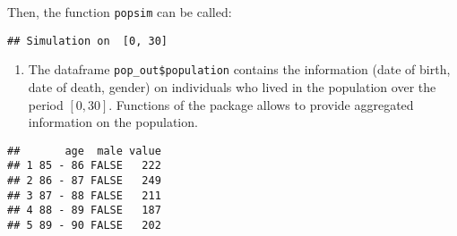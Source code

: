 Then, the function \texttt{popsim} can be called:

\begin{Shaded}
\begin{Highlighting}[]
\StringTok{ }
                   \NormalTok{)}
\end{Highlighting}
\end{Shaded}

\begin{verbatim}
## Simulation on  [0, 30]
\end{verbatim}

\begin{enumerate}
\def\labelenumi{\arabic{enumi}.}
\setcounter{enumi}{5}
\tightlist
\item
  The dataframe \texttt{pop\_out\$population} contains the information (date of birth, date of death, gender) on individuals who lived in the population over the period \([0,30]\). Functions of the package allows to provide aggregated information on the population.
\end{enumerate}

\begin{Shaded}
\begin{Highlighting}[]
\StringTok{ }\OperatorTok{$}
\StringTok{ }\NormalTok{pop\_out[pop\_out}\OperatorTok{$}\OperatorTok{==}\NormalTok{,]}
 \OperatorTok{:}\NormalTok{, } \NormalTok{)}
\end{Highlighting}
\end{Shaded}

\begin{verbatim}
##       age  male value
## 1 85 - 86 FALSE   222
## 2 86 - 87 FALSE   249
## 3 87 - 88 FALSE   211
## 4 88 - 89 FALSE   187
## 5 89 - 90 FALSE   202
\end{verbatim}

\begin{Shaded}
\begin{Highlighting}[]
\StringTok{ } \OperatorTok{:}\NormalTok{,} \OperatorTok{:}\NormalTok{)}
\StringTok{ } \OperatorTok{:}\NormalTok{,} \OperatorTok{:}\NormalTok{)}
\end{Highlighting}
\end{Shaded}


